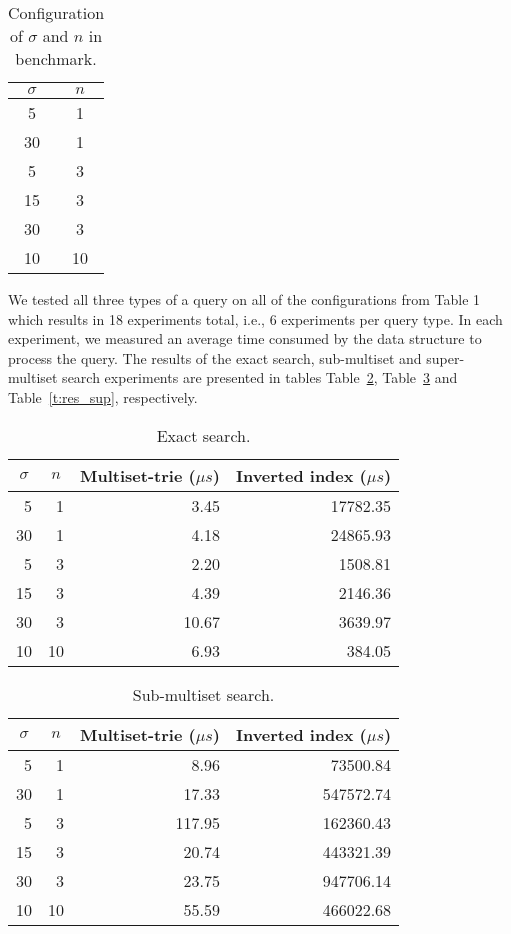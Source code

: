 \begin{table}[h]
\center
\begin{tabular}{|c|c|}
\hline
$\sigma$ & $n$ \\
\hline
5		& 1\\
\hline
30	& 1 \\
\hline
5		& 3 \\
\hline
15	& 3 \\
\hline
30	& 3 \\
\hline
10	& 10 \\
\hline
\end{tabular}
\caption{Configuration of $\sigma$ and $n$ in benchmark.}
\label{t:benchmark}
\end{table}

We tested all three types of a query on all of the configurations from Table 1 which results in 18 experiments total, i.e., 6 experiments per query type. In each experiment, we measured an average time consumed by the data structure to process the query. The results of the exact search, sub-multiset and super-multiset search experiments are presented in tables Table~\ref{t:res_ex}, Table~\ref{t:res_sub} and Table~\ref{t:res_sup}, respectively.

\begin{table}[h]
\center
\begin{tabular}{|r|r|r|r|}
\hline
\multicolumn{1}{|c|}{$\sigma$} & 
\multicolumn{1}{c|}{$n$} & 
\multicolumn{1}{c|}{Multiset-trie ($\mu s$)} & 
\multicolumn{1}{c|}{Inverted index ($\mu s$)} \\
\hline
5		& 1 & 3.45 & 17782.35\\
\hline
30	& 1 & 4.18 & 24865.93\\
\hline
5		& 3 & 2.20 & 1508.81\\
\hline
15	& 3 & 4.39 & 2146.36\\
\hline
30	& 3 & 10.67 & 3639.97\\
\hline
10	& 10 & 6.93 & 384.05\\
\hline
\end{tabular}
\caption{Exact search.}
\label{t:res_ex}
\end{table}

\begin{table}[h]
\center
\begin{tabular}{|r|r|r|r|}
\hline
\multicolumn{1}{|c|}{$\sigma$} & 
\multicolumn{1}{c|}{$n$} & 
\multicolumn{1}{c|}{Multiset-trie ($\mu s$)} & 
\multicolumn{1}{c|}{Inverted index ($\mu s$)} \\
\hline
5		& 1			& 8.96 & 73500.84\\
\hline
30	& 1			& 17.33 & 547572.74\\
\hline
5		& 3			& 117.95 & 162360.43\\
\hline
15	& 3			& 20.74 & 443321.39\\
\hline
30	& 3 		& 23.75 & 947706.14\\
\hline
10	& 10		& 55.59 & 466022.68\\
\hline
\end{tabular}
\caption{Sub-multiset search.}
\label{t:res_sub}
\end{table}

